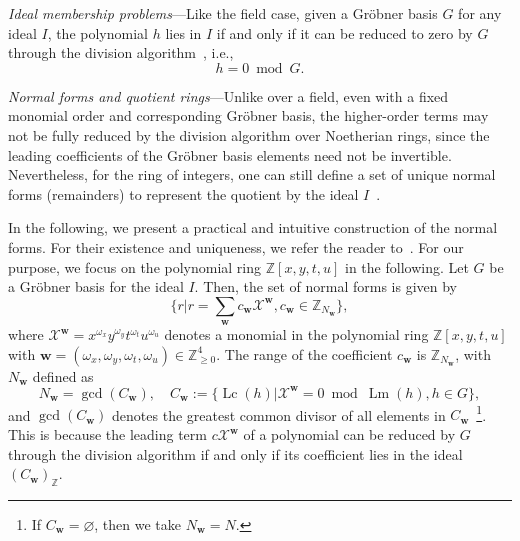\documentclass[aps,prb,english,superscriptaddress,twocolumn,tightenlines,showpacs,longbibliography,floatfix,amsfonts]{revtex4-2}
\begin{document}
\emph{Ideal membership problems}---Like the field case, given a Gr\"{o}bner basis $G$ for any ideal $I$, the polynomial $h$ lies in $I$ if and only if it can be reduced to zero by $G$ through the division algorithm~\cite{Moller1988}, i.e.,
\begin{equation}
    h=0\bmod G.\label{eq:condition_of_ideal_membership}
\end{equation}

\emph{Normal forms and quotient rings}---Unlike over a field, even with a fixed monomial order and corresponding Gr\"{o}bner basis, the higher-order terms may not be fully reduced by the division algorithm over Noetherian rings, since the leading coefficients of the Gr\"{o}bner basis elements need not be invertible. Nevertheless, for the ring of integers, one can still define a set of unique normal forms (remainders) to represent the quotient by the ideal $I$~\cite{Zacharias1978}.
  
In the following, we present a practical and intuitive construction of the normal forms. For their existence and uniqueness, we refer the reader to~\cite{Adams1994}. For our purpose, we focus on the polynomial ring $\mathbb{Z}[x,y,t,u]$ in the following. Let $G$ be a Gr\"{o}bner basis for the ideal $I$. Then, the set of normal forms is given by
\begin{equation}
    \{r|r=\sum_{\mathbf{w}}c_{\mathbf{w}}\mathcal{X}^{\mathbf{w}},c_{\mathbf{w}}\in\mathbb{Z}_{N_{\mathbf{w}}}\},\label{eq:effective_coset_representative}
\end{equation} 
where $\mathcal{X}^{\mathbf{w}}=x^{\omega_x}y^{\omega_y}t^{\omega_t}u^{\omega_u}$ denotes a monomial in the polynomial ring $\mathbb{Z}[x,y,t,u]$ with $\mathbf{w}=(\omega_x,\omega_y,\omega_t,\omega_u)\in\mathbb{Z}_{\geq0}^4$. The range of the coefficient $c_{\mathbf{w}}$ is $\mathbb{Z}_{N_{\mathbf{w}}}$, with $N_{\mathbf{w}}$ defined as
\begin{equation}
    N_{\mathbf{w}}=\gcd(C_{\mathbf{w}}),\quad C_{\mathbf{w}}:=\{\operatorname{Lc}(h)|\mathcal{X}^{\mathbf{w}}=0\bmod\operatorname{Lm}(h),h\in G\},\label{eq:definition of G_M}
\end{equation}
and $\gcd(C_{\mathbf{w}})$ denotes the greatest common divisor of all elements in $C_{\mathbf{w}}$~\footnote{If $C_{\mathbf{w}}=\varnothing$, then we take $N_{\mathbf{w}}=N$.}. This is because the leading term $c\mathcal{X}^{\mathbf{w}}$ of a polynomial can be reduced by $G$ through the division algorithm if and only if its coefficient lies in the ideal $(C_{\mathbf{w}})_{\mathbb{Z}}$. 
\end{document}
